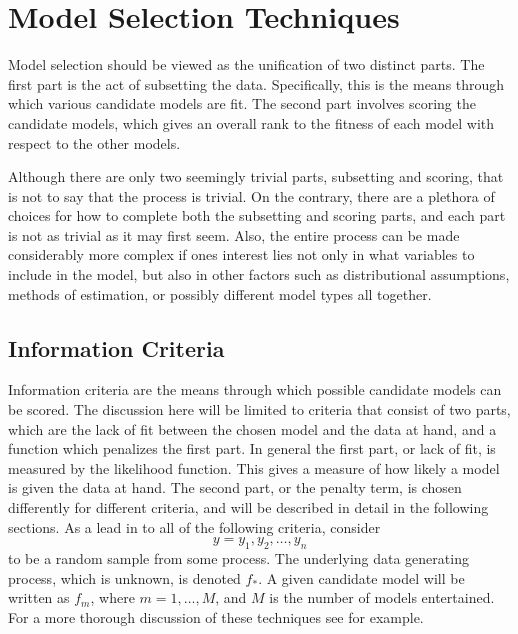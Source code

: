 
\chapter{Model Selection Techniques}

Model selection should be viewed as the unification of two distinct
parts. The first part is the act of subsetting the data. Specifically,
this is the means through which various candidate models are fit.
The second part involves scoring the candidate models, which gives
an overall rank to the fitness of each model with respect to the other
models.

Although there are only two seemingly trivial parts, subsetting and
scoring, that is not to say that the process is trivial. On the contrary,
there are a plethora of choices for how to complete both the subsetting
and scoring parts, and each part is not as trivial as it may first
seem. Also, the entire process can be made considerably more complex
if ones interest lies not only in what variables to include in the
model, but also in other factors such as distributional assumptions,
methods of estimation, or possibly different model types all together.


\section{Information Criteria}

Information criteria are the means through which possible candidate
models can be scored. The discussion here will be limited to criteria
that consist of two parts, which are the lack of fit between the chosen
model and the data at hand, and a function which penalizes the first
part. In general the first part, or lack of fit, is measured by the
likelihood function. This gives a measure of how likely a model is
given the data at hand. The second part, or the penalty term, is chosen
differently for different criteria, and will be described in detail
in the following sections. As a lead in to all of the following criteria,
consider
\begin{equation}
y=y_{1},y_{2},\ldots,y_{n}\label{random sample}
\end{equation}
to be a random sample from some process. The underlying data generating
process, which is unknown, is denoted $f_{\ast}$. A given candidate
model will be written as $f_{m}$, where $m=1,\ldots,M$, and $M$
is the number of models entertained. For a more thorough discussion
of these techniques see \citet{Bozd:1987,Bozd:2000} for example.


